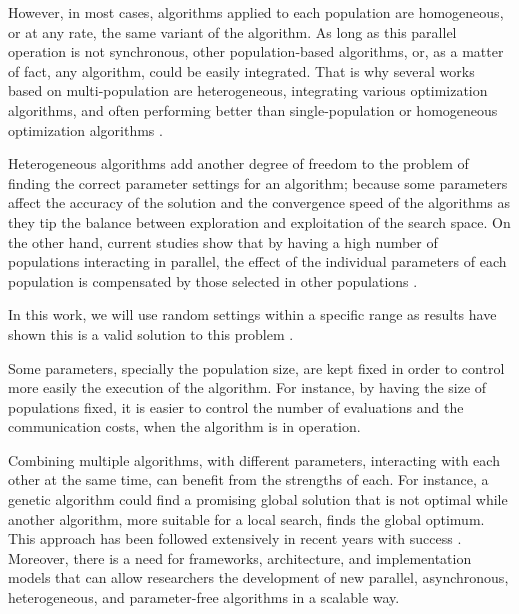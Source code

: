 \documentclass[review]{elsarticle}
\begin{document}
However, in most cases, algorithms applied to each population are
homogeneous, or at any rate, the same variant of the algorithm. As long as this
parallel operation is not synchronous, other population-based algorithms, or, as
a matter of fact, any algorithm, could be easily integrated. That is why several
works based on multi-population are heterogeneous, integrating various
optimization algorithms, and often performing better than single-population or
homogeneous optimization algorithms \cite{wu2016differential,nseef2016adaptive}.

Heterogeneous algorithms add another degree of freedom to the problem of finding
the correct parameter settings for an algorithm; because some parameters affect
the accuracy of the solution and the convergence speed of the algorithms as they
tip the balance between exploration and exploitation of the search space. On the
other hand, current studies show that by having a high number of populations
interacting in parallel, the effect of the individual parameters of each
population is compensated by those selected in other
populations \cite{li2016multi,tanabe2013evaluation}. %

In this work, we will use random settings within a specific range as results have shown
this is a valid solution to this problem \cite{garcia2014randomized}. %

Some parameters, specially the population size, are
kept fixed in order to control more easily the execution of the algorithm. For
instance, by having the size of populations fixed, it is easier to control
the number of evaluations and the communication costs, when the algorithm is in
operation. %

Combining multiple algorithms, with different parameters, interacting with each
other at the same time, can benefit from the strengths of each. For instance, a
genetic algorithm could find a promising global solution that is not optimal
while another algorithm, more suitable for a local search, finds the global
optimum. This approach has been followed extensively in recent years with
success \cite{li2015multi,godio2016multi,biswas2014co}. 
Moreover, there is a need for frameworks, architecture, and
implementation models that can allow researchers the development of new
parallel, asynchronous, heterogeneous, and parameter-free algorithms in a scalable way.  
\end{document}

